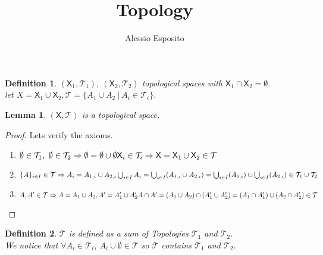 \documentclass{article}
\title{Topology}
\author{Alessio Esposito}
\newtheorem{definition}{Definition}
\newtheorem{lemma}{Lemma}
\begin{document}
\maketitle

\begin{definition}
    $(\mathsf{X}_1, \mathcal{T}_1), \ (\mathsf{X}_2, \mathcal{T}_2)$ topological spaces with $\mathsf{X}_1 \cap \mathsf{X}_2 = \emptyset.$ 
     \\ let $X = \mathsf{X}_1 \cup \mathsf{X}_2, \mathcal{T} = \{ A_1 \cup A_2 \ | \ A_i \in \mathcal{T}_i \}.$
\end{definition}
    \begin{lemma}
        $(\mathsf{X}, \mathcal{T})$ is a topological space.
    \end{lemma}
    
    \begin{proof}
        Lets verify the axioms.
        \begin{enumerate}
            \item $ \emptyset \in \mathcal{T}_1, \ \emptyset \in \mathcal{T}_2 \Rightarrow \emptyset = \emptyset \cup \emptyset \\ \mathsf{X}_i \in \mathcal{T}_i \Rightarrow \mathsf{X} = \mathsf{X}_1 \cup \mathsf{X}_2 \in \mathcal{T}$
            \item $\{A\}_{i\in I} \in \mathcal{T} \Rightarrow A_i = A_{1,i} \cup A_{2,i} \\ \bigcup_{i \in I}A_i = \bigcup_{i \in I}(A_{1,i} \cup A_{2,i}) = \bigcup_{i \in I}(A_{1,i}) \cup \bigcup_{i \in I}(A_{2,i}) \in \mathcal{T}_1 \cup \mathcal{T}_2$
            \item $ A, A' \in \mathcal{T} \Rightarrow A = A_1 \cup A_2, A' = A_1' \cup A_2' \\ A \cap A' = (A_1 \cup A_2) \cap (A_1' \cup A_2') = (A_1 \cap A_1') \cup (A_2 \cap A_2') \in \mathcal{T}  $ 
        \end{enumerate}

    \end{proof}
    \begin{definition}
        $\mathcal{T}$ is defined as a sum of Topologies $\mathcal{T}_1$ and $\mathcal{T}_2$. \\ We notice that $\forall A_i \in \mathcal{T}_i, \ A_i \cup \emptyset \in \mathcal{T}$ so $\mathcal{T}$ contains $\mathcal{T}_1$ and $\mathcal{T}_2.$  

    \end{definition}
        
\end{document}
